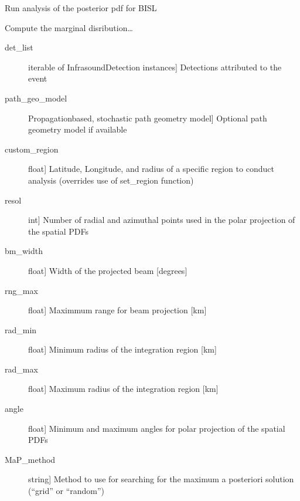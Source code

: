 \documentclass[letterpaper,10pt,english]{sphinxmanual}
\begin{document}
\begin{fulllineitems}
\label{\detokenize{infrapy.location:infrapy.location.bisl.run}}
Run analysis of the posterior pdf for BISL

Compute the marginal disribution…
\begin{description}
\item[{det\_list}] \leavevmode{[}iterable of InfrasoundDetection instances{]}
Detections attributed to the event

\item[{path\_geo\_model}] \leavevmode{[}Propagation\sphinxhyphen{}based, stochastic path geometry model{]}
Optional path geometry model if available

\item[{custom\_region}] \leavevmode{[}float{]}
Latitude, Longitude, and radius of a specific region to conduct analysis (overrides use of set\_region function)

\item[{resol}] \leavevmode{[}int{]}
Number of radial and azimuthal points used in the polar projection of the spatial PDFs

\item[{bm\_width}] \leavevmode{[}float{]}
Width of the projected beam {[}degrees{]}

\item[{rng\_max}] \leavevmode{[}float{]}
Maximmum range for beam projection {[}km{]}

\item[{rad\_min}] \leavevmode{[}float{]}
Minimum radius of the integration region {[}km{]}

\item[{rad\_max}] \leavevmode{[}float{]}
Maximum radius of the integration region {[}km{]}

\item[{angle}] \leavevmode{[}float{]}
Minimum and maximum angles for polar projection of the spatial PDFs

\item[{MaP\_method}] \leavevmode{[}string{]}
Method to use for searching for the maximum a posteriori solution (“grid” or “random”)


\end{description}
\end{fulllineitems}
\end{document}
